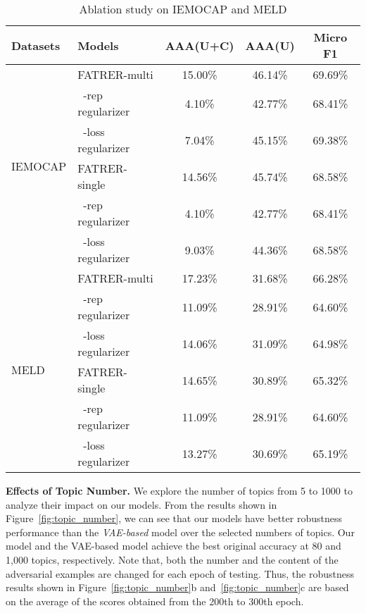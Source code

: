 \documentclass{ecai}
\begin{document}
\begin{table}
    \centering
    \begin{tabular}{p{1.15cm}|p{1.9cm}|c|c|c}
        \toprule
        Datasets&Models & AAA(\textbf{U+C}) & AAA(\textbf{U}) & Micro F1 \\
        \hline
        \hline
        
        \multirow{6}{*}{IEMOCAP}&FATRER-multi & 15.00\% & 46.14\% & 69.69\% \\
        &~-rep regularizer&  4.10\% & 42.77\% & 68.41\% \\
        &~-loss regularizer &  7.04\% &     45.15\% & 69.38\% \\
        \cmidrule{2-5}
        &FATRER-single       & 14.56\% & 45.74\% & 68.58\% \\
        &~-rep regularizer&  4.10\% & 42.77\% & 68.41\% \\
        &~-loss regularizer &  9.03\% &     44.36\% & 68.58\% \\
        \midrule
        \multirow{6}{*}{MELD}&FATRER-multi & 17.23\% & 31.68\% & 66.28\% \\
        &~-rep regularizer& 11.09\% & 28.91\% & 64.60\% \\
        &~-loss regularizer &     14.06\% &     31.09\% &     64.98\% \\
        \cmidrule{2-5}
        &FATRER-single       & 14.65\% & 30.89\% & 65.32\% \\
        &~-rep regularizer& 11.09\% & 28.91\% & 64.60\% \\
        &~-loss regularizer &     13.27\% &     30.69\% &     65.19\% \\
        \bottomrule
    \end{tabular}
    \caption{Ablation study on IEMOCAP and MELD}
    \label{tab:ablation}
\end{table}

\noindent\textbf{Effects of Topic Number.}
We explore the number of topics from 5 to 1000 to analyze their impact on our models. From the results shown in Figure~\ref{fig:topic_number}, we can see that our models have better robustness performance than the \textit{VAE-based} model over the selected numbers of topics. Our model and the VAE-based model achieve the best original accuracy at 80 and 1,000 topics, respectively. Note that, both the number and the content of the adversarial examples are changed for each epoch of testing. Thus, the robustness results shown in Figure~\ref{fig:topic_number}b and~\ref{fig:topic_number}c are based on the average of the scores obtained from the 200th to 300th epoch.
\end{document}
